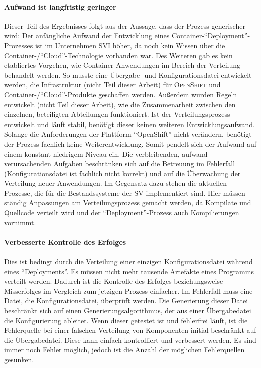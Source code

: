 \paragraph{Aufwand ist langfristig geringer} Dieser Teil des Ergebnisses folgt aus der Aussage, dass der Prozess generischer wird: Der anfängliche Aufwand der Entwicklung eines Container-\enquote{Deployment}-Prozesses ist im Unternehmen \ac{SVI} höher, da noch kein Wissen über die Container-/\enquote{Cloud}-Technologie vorhanden war. Des Weiteren gab es kein etabliertes Vorgehen, wie Container-Anwendungen im Bereich der Verteilung behandelt werden. So musste eine Übergabe- und Konfigurationsdatei entwickelt werden, die Infrastruktur (nicht Teil dieser Arbeit) für \textsc{OpenShift} und Container-/\enquote{Cloud}-Produkte geschaffen werden. Außerdem wurden Regeln entwickelt (nicht Teil dieser Arbeit), wie die Zusammenarbeit zwischen den einzelnen, beteiligten Abteilungen funktioniert. Ist der Verteilungsprozess entwickelt und läuft stabil, benötigt dieser keinen weiteren Entwicklungsaufwand. Solange die Anforderungen der Plattform \enquote{OpenShift} nicht verändern, benötigt der Prozess fachlich keine Weiterentwicklung. Somit pendelt sich der Aufwand auf einem konstant niedrigem Niveau ein. Die verbleibenden, aufwand-verursachenden Aufgaben beschränken sich auf die Betreuung im Fehlerfall (Konfigurationsdatei ist fachlich nicht korrekt) und auf die Überwachung der Verteilung neuer Anwendungen. Im Gegensatz dazu stehen die aktuellen Prozesse, die für die Bestandssysteme der \ac{SV} implementiert sind. Hier müssen ständig Anpassungen am Verteilungsprozess gemacht werden, da Kompilate und Quellcode verteilt wird und der \enquote{Deployment}-Prozess auch Kompilierungen vornimmt.
 
\paragraph{Verbesserte Kontrolle des Erfolges} Dies ist bedingt durch die Verteilung einer einzigen Konfigurationsdatei während eines \enquote{Deployments}. Es müssen nicht mehr tausende Artefakte eines Programms verteilt werden. Dadurch ist die Kontrolle des Erfolges beziehungsweise Misserfolges im Vergleich zum jetzigen Prozess einfacher. Im Fehlerfall muss eine Datei, die Konfigurationsdatei, überprüft werden. Die Generierung dieser Datei beschränkt sich auf einen Generierungsalgorithmus, der aus einer Übergabedatei die Konfigurierung ableitet. Wenn dieser getestet ist und fehlerfrei läuft, ist die Fehlerquelle bei einer falschen Verteilung von Komponenten initial beschränkt auf die Übergabedatei. Diese kann einfach kontrolliert und verbessert werden. Es sind immer noch Fehler möglich, jedoch ist die Anzahl der möglichen Fehlerquellen gesunken.

